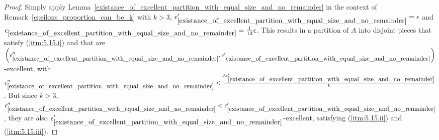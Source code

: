         \begin{proof}
            Simply apply Lemma~\ref{existance_of_excellent_partition_with_equal_size_and_no_remainder} in the context of
            Remark~\ref{epsilons_proportion_can_be_k} with $k > 3$, ${\epsilon'_{\ref{existance_of_excellent_partition_with_equal_size_and_no_remainder}}} = \epsilon$
            and ${\epsilon_{\ref{existance_of_excellent_partition_with_equal_size_and_no_remainder}}} = \frac{1}{12} \epsilon$.
            This results in a partition of $A$ into disjoint pieces that satisfy (\ref{itm:5.15.i}) and that are
            $\left( {\epsilon''_{\ref{existance_of_excellent_partition_with_equal_size_and_no_remainder}}},
                \epsilon'_{\ref{existance_of_excellent_partition_with_equal_size_and_no_remainder}} \right)$-excellent,
            with ${\epsilon''_{\ref{existance_of_excellent_partition_with_equal_size_and_no_remainder}}} <
                \frac{3 \epsilon'_{\ref{existance_of_excellent_partition_with_equal_size_and_no_remainder}}}{k}$.
            But since $k > 3$, ${\epsilon''_{\ref{existance_of_excellent_partition_with_equal_size_and_no_remainder}}} <
                \epsilon'_{\ref{existance_of_excellent_partition_with_equal_size_and_no_remainder}}$, they are also
            $\epsilon'_{\ref{existance_of_excellent_partition_with_equal_size_and_no_remainder}}$-excellent, satisfying
            (\ref{itm:5.15.ii}) and (\ref{itm:5.15.iii}).
        \end{proof}

